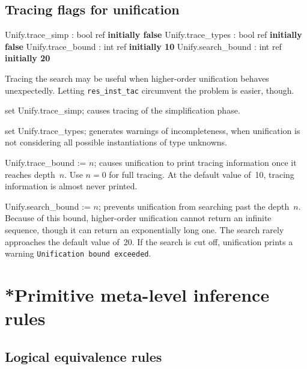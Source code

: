 \subsection{Tracing flags for unification}

\begin{ttbox} 
Unify.trace_simp   : bool ref \hfill\textbf{initially false}
Unify.trace_types  : bool ref \hfill\textbf{initially false}
Unify.trace_bound  : int ref \hfill\textbf{initially 10}
Unify.search_bound : int ref \hfill\textbf{initially 20}
\end{ttbox}
Tracing the search may be useful when higher-order unification behaves
unexpectedly.  Letting {\tt res_inst_tac} circumvent the problem is easier,
though.
\begin{ttdescription}
\item[set Unify.trace_simp;] 
causes tracing of the simplification phase.

\item[set Unify.trace_types;] 
generates warnings of incompleteness, when unification is not considering
all possible instantiations of type unknowns.

\item[Unify.trace_bound := $n$;] 
causes unification to print tracing information once it reaches depth~$n$.
Use $n=0$ for full tracing.  At the default value of~10, tracing
information is almost never printed.

\item[Unify.search_bound := $n$;] prevents unification from
  searching past the depth~$n$.  Because of this bound, higher-order
  unification cannot return an infinite sequence, though it can return
  an exponentially long one.  The search rarely approaches the default value
  of~20.  If the search is cut off, unification prints a warning
  \texttt{Unification bound exceeded}.
\end{ttdescription}


\section{*Primitive meta-level inference rules}

\subsection{Logical equivalence rules}

